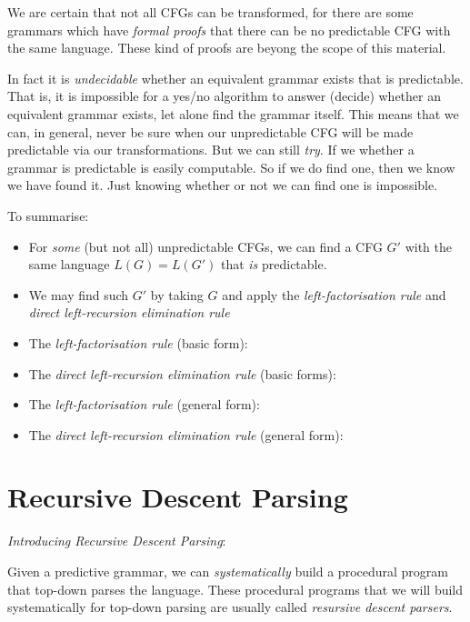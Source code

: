 We are certain that not all CFGs can be transformed, 
for there are some grammars which have \textit{formal proofs} that there can be no 
predictable CFG with the same language. These kind of proofs are beyong the scope 
of this material.


In fact it is
\textit{undecidable} whether an equivalent grammar exists that is predictable. 
That is, it is impossible for a yes/no algorithm to answer (decide)
whether an equivalent grammar exists, 
let alone find the grammar itself. This means that we can, in general, 
never be sure when our unpredictable CFG will be made predictable 
via our transformations. But we can still \textit{try}. 
If we whether a grammar is predictable is easily computable. 
So if we do find one, then we know we have found it. Just knowing 
whether or not we can find one is impossible. 

To summarise:
\begin{itemize}
\item For \textit{some} (but not all) unpredictable CFGs, we can find 
a CFG $G'$ with the same language $L(G) = L(G')$ that \textit{is} predictable. 
\item We may find such $G'$ by taking $G$ and apply the \textit{left-factorisation rule} 
and \textit{direct left-recursion elimination rule}
\item The \textit{left-factorisation rule} (basic form):
\item The \textit{direct left-recursion elimination rule} (basic forms):
\item The \textit{left-factorisation rule} (general form):
\item The \textit{direct left-recursion elimination rule} (general form):
\end{itemize}



\section{Recursive Descent Parsing}

\textit{Introducing Recursive Descent Parsing}:

Given a predictive grammar, we can \textit{systematically}
build a procedural program that top-down parses the language.
These procedural programs that we will build systematically for top-down 
parsing are usually called \textit{resursive descent parsers}. 

